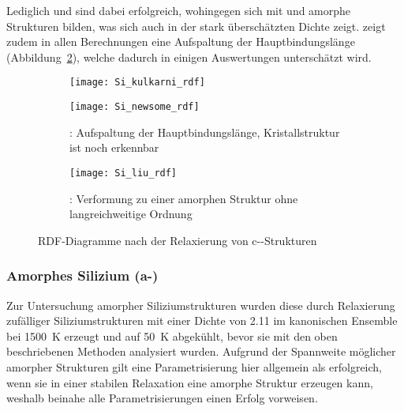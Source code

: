 Lediglich  und  sind dabei erfolgreich, wohingegen sich mit  und  amorphe Strukturen bilden, was sich auch in der stark überschätzten Dichte zeigt.
 zeigt zudem in allen Berechnungen eine Aufspaltung der Hauptbindungslänge (Abbildung~\ref{fig:newsomerdf}), welche dadurch in einigen Auswertungen unterschätzt wird.

\begin{figure}[H]
  \centering

  \captionsetup[subfigure]{singlelinecheck=false}
  \def\subfigwidth{\textwidth}
  \begin{subfigure}[t]{\subfigwidth}
    \texttt{[image: Si\_kulkarni\_rdf]}
    \label{fig:kulkarnirdf}
  \end{subfigure}

  \vspace{1em}

  \begin{subfigure}[t]{\subfigwidth}
    \texttt{[image: Si\_newsome\_rdf]}
    \caption{: Aufspaltung der Hauptbindungslänge, Kristallstruktur ist noch erkennbar}
    \label{fig:newsomerdf}
  \end{subfigure}

  \vspace{1em}

  \begin{subfigure}[t]{\subfigwidth}
    \texttt{[image: Si\_liu\_rdf]}
    \caption{: Verformung zu einer amorphen Struktur ohne langreichweitige Ordnung}
    \label{fig:liurdf}
  \end{subfigure}

  \caption{RDF-Diagramme nach der Relaxierung von c--Strukturen}
  \label{fig:siliconrdf}
\end{figure}

\subsubsection{Amorphes Silizium (a-)}

Zur Untersuchung amorpher Siliziumstrukturen wurden diese durch Relaxierung zufälliger Siliziumstrukturen mit einer Dichte von \SI{2.11}{\gpcc} im kanonischen Ensemble bei \SI{1500}{\kelvin} erzeugt und auf \SI{50}{\kelvin} abgekühlt, bevor sie mit den oben beschriebenen Methoden analysiert wurden.
Aufgrund der Spannweite möglicher amorpher Strukturen gilt eine Parametrisierung hier allgemein als erfolgreich, wenn sie in einer stabilen Relaxation eine amorphe Struktur erzeugen kann, weshalb beinahe alle Parametrisierungen einen Erfolg vorweisen.

